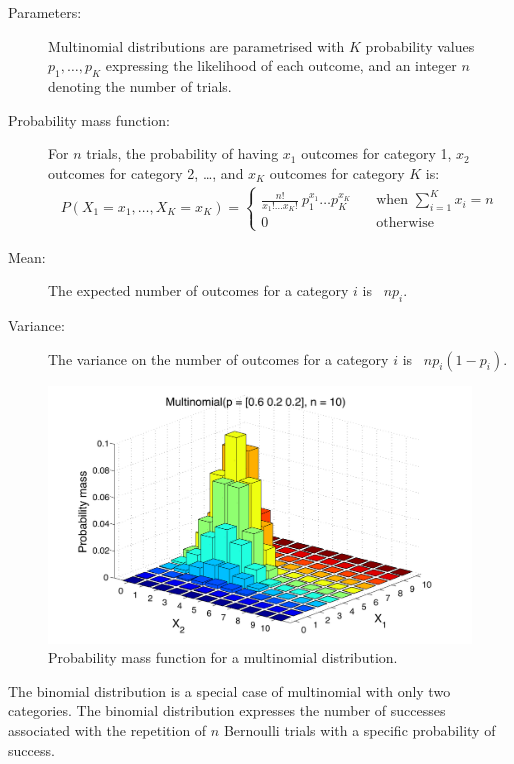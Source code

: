 \begin{description}
\item [Parameters: ] Multinomial distributions are parametrised with $K$ probability values $p_1, \dots, p_K$ expressing the likelihood of each outcome, and an integer $n$ denoting the number of trials.

\item [Probability mass function: ] For $n$ trials,  the probability of having $x_1$ outcomes for category 1, $x_2$ outcomes for category 2, \dots, and $x_K$ outcomes for category $K$ is:
\begin{align}
P(X_1 = x_1,\dots, X_K = x_K)  = \begin{cases} { \displaystyle \frac{n!}{x_1!\dots x_K!}\ p_1^{x_1} \dots p_K^{x_K}} \quad &
\mbox{when } \sum_{i=1}^K x_i=n \\
0 & \mbox{otherwise} \end{cases}
\end{align} 
\item [Mean: ] The expected number of outcomes for a category $i$ is \ $ n p_i$.

\item [Variance: ] The variance on the number of outcomes for a category $i$ is \ $n  p_i (1-p_i)$.
\end{description}

\begin{figure}[h!]
\centering
\includegraphics[scale=0.40]{imgs/multinomial_appendix.pdf}
\caption{Probability mass function for a multinomial distribution.} 
\label{fig:multinomial-appendix}
\end{figure}

The binomial distribution is a special case of multinomial with only two categories.  The binomial distribution expresses the number of successes associated with the repetition of $n$ Bernoulli trials with a specific probability of success. 

